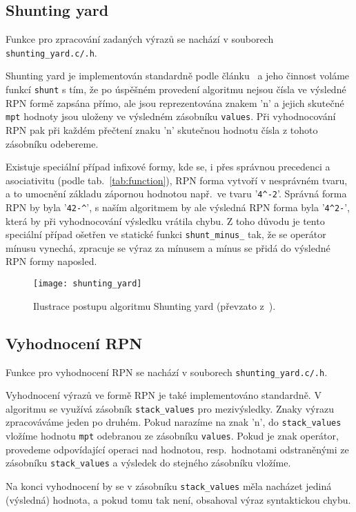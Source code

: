 \subsection{Shunting yard}
Funkce pro zpracování zadaných výrazů se nachází v souborech \verb|shunting_yard.c/.h|.

Shunting yard je implementován standardně podle článku~\cite{bib:shunting_yard} a jeho činnost voláme funkcí \verb|shunt| s tím, že po úspěšném provedení algoritmu nejsou čísla ve výsledné RPN formě zapsána přímo, ale jsou reprezentována znakem 'n' a jejich skutečné \verb|mpt| hodnoty jsou uloženy ve výsledném zásobníku \verb|values|. Při vyhodnocování RPN pak při každém přečtení znaku 'n' skutečnou hodnotu čísla z tohoto zásobníku odebereme. 

Existuje speciální případ infixové formy, kde se, i přes správnou precedenci a asociativitu (podle tab.~\ref{tab:function}), RPN forma vytvoří v nesprávném tvaru, a to umocnění základu zápornou hodnotou např.~ve tvaru '\verb|4^-2|'. Správná forma RPN by byla '\verb|42-^|', s naším algoritmem by ale výsledná RPN forma byla '\verb|4^2-|', která by při vyhodnocování výsledku vrátila chybu. Z toho důvodu je tento speciální případ ošetřen ve statické funkci \verb|shunt_minus_| tak, že se operátor mínusu vynechá, zpracuje se výraz za mínusem a mínus se přidá do výsledné RPN formy naposled.

\begin{figure}[ht]
    \centering 
    \texttt{[image: shunting\_yard]}
    \caption{Ilustrace postupu algoritmu Shunting yard (převzato z~\cite{bib:shunting_yard}).}\label{fig:shunting_yard}
\end{figure}

\subsection{Vyhodnocení RPN}
Funkce pro vyhodnocení RPN se nachází v souborech \verb|shunting_yard.c/.h|.

Vyhodnocení výrazů ve formě RPN je také implementováno standardně. V algoritmu se využívá zásobník \verb|stack_values| pro mezivýsledky. Znaky výrazu zpracováváme jeden po druhém. Pokud narazíme na znak 'n', do \verb|stack_values| vložíme hodnotu \verb|mpt| odebranou ze zásobníku \verb|values|. Pokud je znak operátor, provedeme odpovídající operaci nad hodnotou, resp.~hodnotami odstraněnými ze zásobníku \verb|stack_values| a výsledek do stejného zásobníku vložíme.

Na konci vyhodnocení by se v zásobníku \verb|stack_values| měla nacházet jediná (výsledná) hodnota, a pokud tomu tak není, obsahoval výraz syntaktickou chybu.